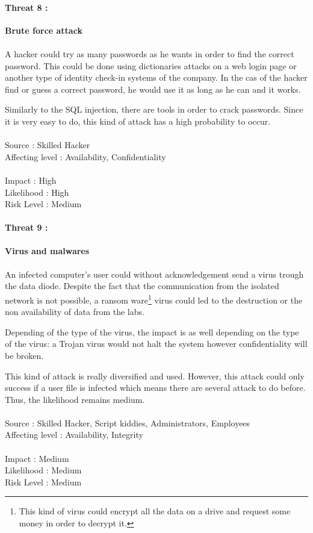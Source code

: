 \documentclass[a4paper,10pt]{article}
\begin{document}
\paragraph{Threat 8 :}  \textbf{Brute force attack} 
\paragraph{}A hacker could try as many passwords as he wants in order to find the correct password. This could be done using dictionaries attacks on a web login page or another type of identity check-in systems of the company. In the cas of the hacker find or guess a correct password, he would use it as long as he can and it works.

Similarly to the SQL injection, there are tools in order to crack passwords. Since it is very easy to do, this kind of attack has a high probability to occur. \\ \\
Source : Skilled Hacker \\ 
Affecting level : Availability, Confidentiality \\ \\
Impact : High \\
Likelihood : High \\
Risk Level : Medium

\paragraph{Threat 9 :}  \textbf{Virus and malwares} 
\paragraph{}An infected computer's user could without acknowledgement send a virus trough the data diode. Despite the fact that the communication from the isolated network is not possible, a ransom ware\footnote{This kind of virus could encrypt all the data on a drive and request some money in order to decrypt it.} virus could led to the destruction or the non availability of data from the labs.

Depending of the type of the virus, the impact is as well depending on the type of the virus: a Trojan virus would not halt the system however confidentiality will be broken. 

This kind of attack is really diversified and used. However, this attack could only success if a user file is infected which means there are several attack to do before. Thus, the likelihood remains medium. \\ \\
Source : Skilled Hacker, Script kiddies, Administrators, Employees  \\ 
Affecting level : Availability, Integrity \\ \\
Impact : Medium \\
Likelihood : Medium \\
Risk Level : Medium
\end{document}
